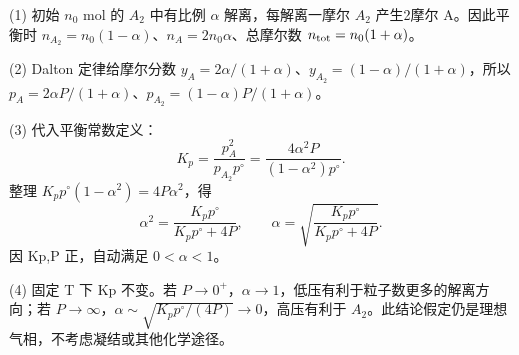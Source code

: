(1) 初始 \(n_0\) mol 的 \(A_{2}\) 中有比例 \(\alpha \) 解离，每解离一摩尔 \(A_{2}\) 产生2摩尔 A。因此平衡时 \(n_{A_2}=n_0(1-\alpha)\)、\(n_A=2n_0\alpha\)、总摩尔数 \(n_{\rm tot}=n_0(1+\alpha)\)。

(2) Dalton 定律给摩尔分数 \(y_A=2\alpha/(1+\alpha)\)、\(y_{A_2}=(1-\alpha)/(1+\alpha)\)，所以 \(p_A=2\alpha P/(1+\alpha)\)、\(p_{A_2}=(1-\alpha)P/(1+\alpha)\)。

(3) 代入平衡常数定义：
\[
K_p=\frac{p_A^2}{p_{A_2}p^\circ}
=\frac{4\alpha^2P}{(1-\alpha^2)p^\circ}.
\]
整理 \(K_pp^\circ(1-\alpha^2)=4P\alpha^2\)，得
\[
\alpha^2=\frac{K_pp^\circ}{K_pp^\circ+4P},\qquad
\alpha=\sqrt{\frac{K_pp^\circ}{K_pp^\circ+4P}}.
\]
因 Kp,P 正，自动满足 \(0<\alpha <1\)。

(4) 固定 T 下 Kp 不变。若 \(P\to0^+\)，\(\alpha \to 1\)，低压有利于粒子数更多的解离方向；若 \(P\to\infty\)，\(\alpha\sim\sqrt{K_pp^\circ/(4P)}\to0\)，高压有利于 \(A_{2}\)。此结论假定仍是理想气相，不考虑凝结或其他化学途径。
